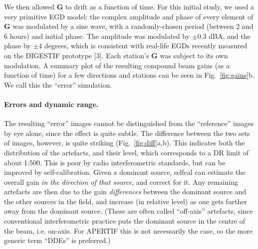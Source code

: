 \documentclass{aps2010} \special{papersize=8.5in,11in}
\begin{document}
We then allowed $\mathbf{G}$ to drift as a function of time. For this initial study, we used a very primitive EGD model: the complex amplitude and phase of every element of $\mathbf{G}$ was modulated by a  sine wave, with a randomly-chosen period (between 2 and 6 hours) and initial phase. The amplitude was modulated by $\pm0.3$ dBA, and the phase by $\pm4$ degrees, which is consistent with real-life EGDs recently measured on the DIGESTIF prototype [3]. Each station's $\mathbf{G}$ was subject to its own modulation. A summary plot of the resulting compound beam gains (as a function of time) for a few directions and stations can be seen in Fig.~\ref{fig:gains}b. We call this the ``error'' simulation.

\paragraph*{Errors and dynamic range.} The resulting ``error'' images cannot be distinguished from the ``reference'' images by eye alone, since the effect is quite subtle. The difference between the two sets of images, however, is quite striking (Fig.~\ref{fig:diff}a,b). This indicates both the distribution of the artefacts, and their level, which corresponds to a DR limit of about 1:500. This is poor by radio interferometric standards, but can be improved by self-calibration. Given a dominant source, selfcal can estimate the overall gain \emph{in the direction of that source}, and correct for it. Any remaining artefacts are then due to the gain \emph{differences} between the dominant source and the other sources in the field, and increase (in relative level) as one gets further away from the dominant source. (These are often called ``off-axis'' artefacts, since conventional interferometric practice puts the dominant source in the centre of the beam, i.e. on-axis. For APERTIF this is not necessarily the case, so the more generic term ``DDEs'' is preferred.) 
\end{document}
